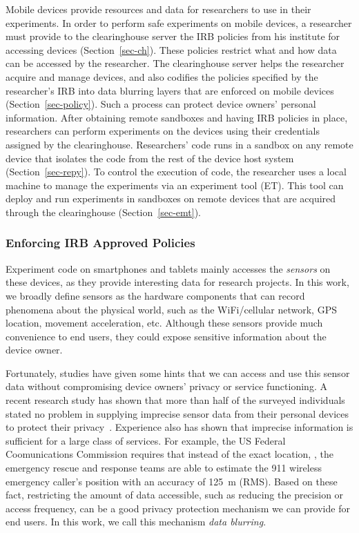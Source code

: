 Mobile devices
provide resources and data for researchers to use in their
experiments. In order to perform safe experiments on mobile
devices, a researcher must provide to the clearinghouse server
the IRB policies from his institute for accessing devices 
(Section~\ref{sec-ch}).  These 
policies restrict what and how data can be accessed by the 
researcher. The
clearinghouse server helps the researcher acquire and manage
devices, and also codifies the policies specified by the
researcher's IRB into data blurring layers that are enforced on
mobile devices (Section~\ref{sec-policy}). Such a process can protect device
owners' personal information. After obtaining remote sandboxes
and having IRB policies in place, researchers can perform
experiments on the devices using their credentials assigned by
the clearinghouse. Researchers' code runs in a sandbox on any
remote device that isolates the code from the rest of the device
host system (Section~\ref{sec-repy}). To control the execution of 
code, the researcher uses a local machine to manage the 
experiments via an experiment tool (ET). This tool can deploy 
and run experiments in sandboxes on remote devices that are 
acquired through the clearinghouse (Section~\ref{sec-emt}).

\subsubsection{Enforcing IRB Approved Policies}
Experiment code on smartphones and tablets mainly accesses
the \textit{sensors} on these devices, as they provide  
interesting data for research projects. In this work, we broadly 
define sensors as the hardware components that can record 
phenomena about the physical world, such as the WiFi/cellular 
network, GPS location, movement acceleration, etc. Although
these sensors provide much convenience to end users, they 
could expose sensitive information about the device 
owner.

Fortunately, studies have given some hints that we can access and use 
this sensor data without compromising device owners' privacy or service functioning.
A recent research study has shown that more than half of the 
surveyed individuals stated no problem in supplying imprecise 
sensor data from their personal devices to protect their 
privacy~\cite{fawaz2014location}. Experience also has shown 
that imprecise information is sufficient for a large class of 
services. For example, the US Federal Coomunications 
Commission requires that instead of the exact location, , the 
emergency rescue and response teams are able to estimate the 911 
wireless emergency caller's position with an accuracy of 125~m 
(RMS). Based on these fact, restricting 
the amount of data accessible, such as reducing the precision or 
access frequency, can be a good privacy protection mechanism we can 
provide for end users. In this work, we call this mechanism 
\textit{data blurring}.

